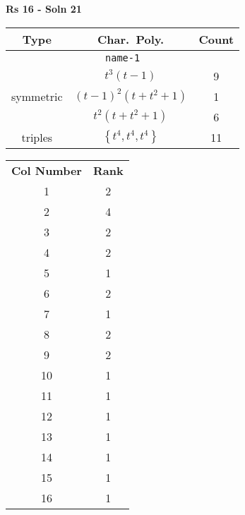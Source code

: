\documentclass{article}
\begin{document}
    \textbf{Rs 16 - Soln 21}
    \begin{table}
    \begin{tabular}{|c|c|c|}
    \hline
    \textbf{Type} & \textbf{Char.~Poly.} & \textbf{Count} \\
    \hline \multicolumn{3}{|c|}{\texttt{name-1}} \\ \hline
    \multirow{3}{*}{symmetric}
    & $t^3(t - 1)$ & 9 \\
    & $(t - 1)^2(t + t^2 + 1)$ & 1 \\
    & $t^2(t + t^2 + 1)$ & 6 \\
    \hline
    \multirow{1}{*}{triples}
    & $\left\{t^4,t^4,t^4\right\}$ & 11 \\
    \hline
    \end{tabular}
    \end{table}
    \begin{table}
    \begin{tabular}{|c|c|}
    \hline
    \textbf{Col Number} & \textbf{Rank}\\
    1 & 2 \\ 
    2 & 4 \\ 
    3 & 2 \\ 
    4 & 2 \\ 
    5 & 1 \\ 
    6 & 2 \\ 
    7 & 1 \\ 
    8 & 2 \\ 
    9 & 2 \\ 
    10 & 1 \\ 
    11 & 1 \\ 
    12 & 1 \\ 
    13 & 1 \\ 
    14 & 1 \\ 
    15 & 1 \\ 
    16 & 1 \\ 
    \hline
    \end{tabular}
    \end{table}
    \newpage
\end{document}
